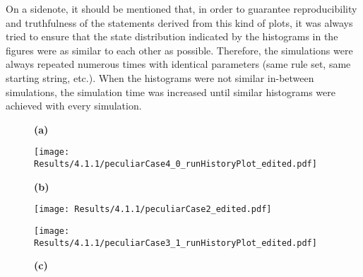             On a sidenote, it should be mentioned that, in order to guarantee reproducibility and truthfulness of the statements derived from this kind of plots, it was always tried to ensure that the state distribution indicated by the histograms in the figures were as similar to each other as possible. Therefore, the simulations were always repeated numerous times with identical parameters (same rule set, same starting string, etc.). When the histograms were not similar in-between simulations, the simulation time was increased until similar histograms were achieved with every simulation.

            \begin{figure}[htpb!]
                \centering
                \begin{minipage}{\textwidth}
                    \begin{minipage}{0.1\textwidth}
                        \caption*{\small \textbf{(a)}}
                    \end{minipage}
                    \begin{minipage}{0.85\textwidth}
                        \texttt{[image: Results/4.1.1/peculiarCase4\_0\_runHistoryPlot\_edited.pdf]}
                    \end{minipage}
                \end{minipage}
                \begin{minipage}{\textwidth}
                    \begin{minipage}{0.1\textwidth}
                        \caption*{\small \textbf{(b)}}
                    \end{minipage}
                    \begin{minipage}{0.85\textwidth}
                        \texttt{[image: Results/4.1.1/peculiarCase2\_edited.pdf]}
                    \end{minipage}
                \end{minipage}
                \begin{minipage}{\textwidth}
                    \begin{minipage}{0.1\textwidth}
                        \caption*{\small \textbf{(c)}}
                    \end{minipage}
                    \begin{minipage}{0.85\textwidth}
                        \texttt{[image: Results/4.1.1/peculiarCase3\_1\_runHistoryPlot\_edited.pdf]}

\end{minipage}
\end{minipage}
\end{figure}
